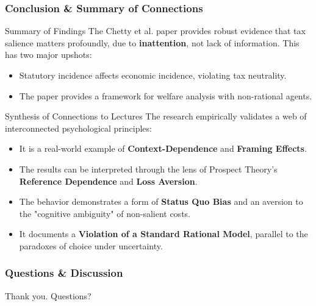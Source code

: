 \documentclass{beamer}
\begin{document}
\begin{frame}
\frametitle{Conclusion \& Summary of Connections}

\begin{block}{Summary of Findings}
The Chetty et al. paper provides robust evidence that tax salience matters profoundly, due to \textbf{inattention}, not lack of information. This has two major upshots:
\begin{itemize}
    \item Statutory incidence affects economic incidence, violating tax neutrality.
    \item The paper provides a framework for welfare analysis with non-rational agents.
\end{itemize}
\end{block}

\begin{alertblock}{Synthesis of Connections to Lectures}
The research empirically validates a web of interconnected psychological principles:
\begin{itemize}
    \item It is a real-world example of \textbf{Context-Dependence} and \textbf{Framing Effects}.
    \item The results can be interpreted through the lens of Prospect Theory's \textbf{Reference Dependence} and \textbf{Loss Aversion}.
    \item The behavior demonstrates a form of \textbf{Status Quo Bias} and an aversion to the "cognitive ambiguity" of non-salient costs.
    \item It documents a \textbf{Violation of a Standard Rational Model}, parallel to the paradoxes of choice under uncertainty.
\end{itemize}
\end{alertblock}

\end{frame}

\begin{frame}
\frametitle{Questions \& Discussion}
  \begin{center}
    \Huge Thank you.
    \vspace{2cm}
    \Large Questions?
  \end{center}
\end{frame}
\end{document}
